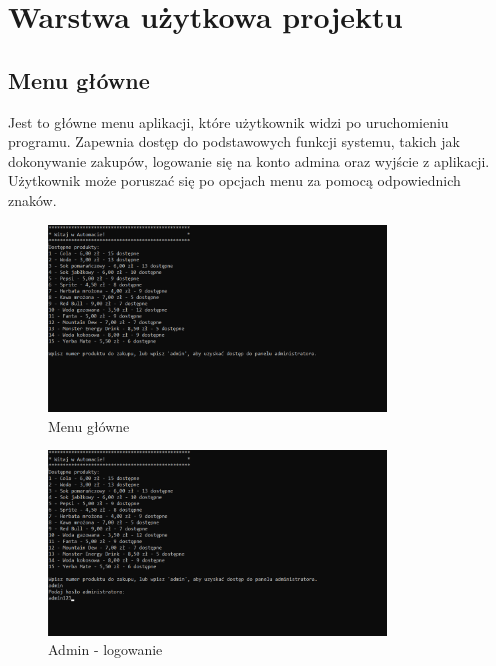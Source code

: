 ﻿%
\chapter{Warstwa użytkowa projektu}
\section{Menu główne}


Jest to główne menu aplikacji, które użytkownik widzi po uruchomieniu programu. Zapewnia dostęp do podstawowych funkcji systemu, takich jak dokonywanie zakupów, logowanie się na konto admina oraz wyjście z aplikacji. Użytkownik może poruszać się po opcjach menu za pomocą odpowiednich znaków.



\begin{figure}[H] 
    \centering
    \includegraphics[width=0.8\textwidth]{grafiki/menu_glowne.PNG}
    \caption{\footnotesize Menu główne}	
\end{figure}

\newpage

\begin{figure}[H] 
    \centering
    \includegraphics[width=0.8\textwidth]{grafiki/admin_log.png}
    \caption{\footnotesize Admin - logowanie}	
    \label{fig:5.2}

\end{figure}

